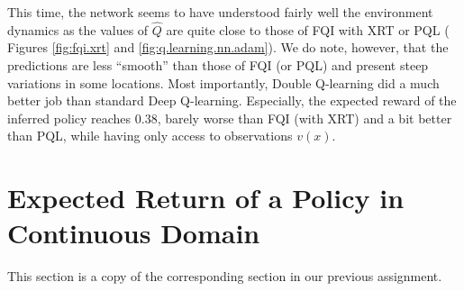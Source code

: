 \documentclass[a4paper, 12pt]{article}
\begin{document}
    This time, the network seems to have understood fairly well the environment dynamics as the values of $\hat{Q}$ are quite close to those of FQI with XRT or PQL (\cf{} Figures \ref{fig:fqi.xrt} and \ref{fig:q.learning.nn.adam}). We do note, however, that the predictions are less \enquote{smooth} than those of FQI (or PQL) and present steep variations in some locations. Most importantly, Double Q-learning did a much better job than standard Deep Q-learning. Especially, the expected reward of the inferred policy reaches \num{0.38}, \ie{} barely worse than FQI (with XRT) and a bit better than PQL, while having only access to observations $v(x)$.
    
    \newpage
    
    \appendix
    
    \section{Expected Return of a Policy in Continuous Domain}\label{sec:expected.return}
    
    \begin{note}
        This section is a copy of the corresponding section in our previous assignment.
    \end{note}
    
\end{document}
